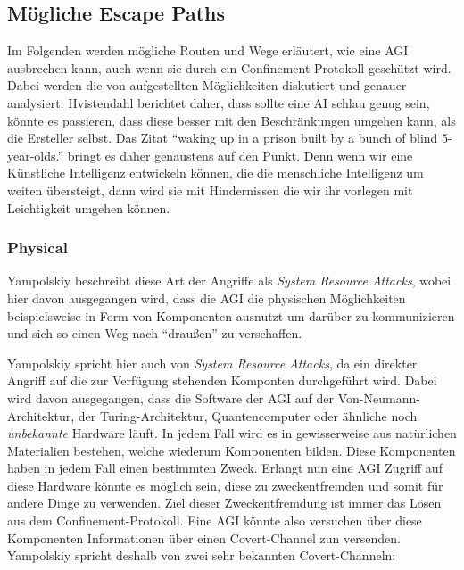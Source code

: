         \subsection{Mögliche Escape Paths}
        Im Folgenden werden mögliche Routen und Wege erläutert, wie eine AGI ausbrechen kann, auch wenn sie durch ein
        Confinement-Protokoll geschützt wird. Dabei werden die von \citep{yampolskiy2012leakproofing} aufgestellten
        Möglichkeiten diskutiert und genauer analysiert. Hvistendahl berichtet daher, dass sollte eine AI schlau genug
        sein, könnte es passieren, dass diese besser mit den Beschränkungen umgehen kann, als die Ersteller selbst.
        \cite{hvistendahl_2019} Das Zitat ``waking up in a prison built by a bunch of blind 5-year-olds.'' bringt es
        daher genaustens auf den Punkt. Denn wenn wir eine Künstliche Intelligenz entwickeln können, die die menschliche
        Intelligenz um weiten übersteigt, dann wird sie mit Hindernissen die wir ihr vorlegen mit Leichtigkeit umgehen
        können.

        \subsubsection{Physical}
        Yampolskiy beschreibt diese Art der Angriffe als \textit{System Resource Attacks}, wobei hier davon ausgegangen
        wird, dass die AGI die physischen Möglichkeiten beispielsweise in Form von Komponenten ausnutzt um darüber zu
        kommunizieren und sich so einen Weg nach ``draußen'' zu verschaffen.\cite{yampolskiy2012leakproofing}

        Yampolskiy spricht hier auch von \textit{System Resource Attacks}, da ein direkter Angriff auf die zur Verfügung
        stehenden Komponten durchgeführt wird. Dabei wird davon ausgegangen, dass die Software der AGI auf der
        Von-Neumann-Architektur, der Turing-Architektur, Quantencomputer oder ähnliche noch \textit{unbekannte} Hardware
        läuft. In jedem Fall wird es in gewisserweise aus natürlichen Materialien bestehen, welche wiederum Komponenten
        bilden. Diese Komponenten haben in jedem Fall einen bestimmten Zweck. Erlangt nun eine AGI Zugriff auf diese
        Hardware könnte es möglich sein, diese zu zweckentfremden und somit für andere Dinge zu verwenden.\cite[p. 199]{yampolskiy2012leakproofing}
        Ziel dieser Zweckentfremdung ist immer das Lösen aus dem Confinement-Protokoll. Eine AGI könnte also versuchen
        über diese Komponenten Informationen über einen Covert-Channel zun versenden. Yampolskiy spricht deshalb von
        zwei sehr bekannten Covert-Channeln:

